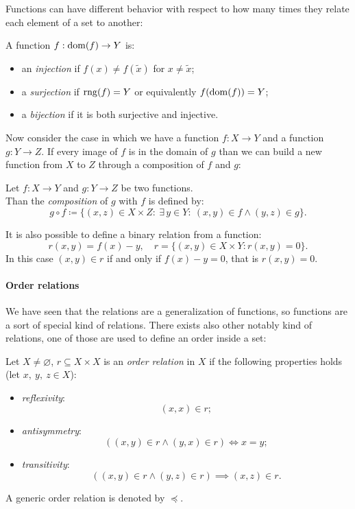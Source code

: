 Functions can have different behavior with respect to how many times they relate each element of a set to another:

\begin{defn}
	A function $f: \operatorname{dom}(f) \to Y$ is:
	\begin{itemize}
		\item an \emph{injection} if $f(x) \neq f(\tilde{x})$ for $x\neq \tilde{x}$;
		\item a \emph{surjection} if $\operatorname{rng}(f) = Y$ or equivalently $f(\operatorname{dom}(f)) = Y$;
		\item a \emph{bijection} if it is both surjective and injective.
	\end{itemize}
\end{defn}

Now consider the case in which we have a function $f: X \to Y$ and a function $g:Y \to Z$. If every image of $f$ is in the domain of $g$ than we can build a new function from $X$ to $Z$ through a composition of $f$ and $g$:
\begin{defn}
	Let $f: X \to Y$ and $g: Y \to Z$ be two functions.\\
	Than the \emph{composition} of $g$ with $f$ is defined by:
	$$
		g \circ f 
		\coloneqq \{(x,z)\in X \times Z :\ \exists \, y\in Y :\ (x,y) \in f \wedge (y,z)\in g \}
	.
	$$
\end{defn}

It is also possible to define a binary relation from a function:
$$r(x,y) = f(x) - y, \quad r = \{(x,y) \in X \times Y : r(x,y) = 0\}.$$
In this case $(x,y) \in r$ if and only if $f(x)-y =0$, that is $r(x,y) = 0$.


\paragraph{Order relations}

We have seen that the relations are a generalization of functions, so functions are a sort of special kind of relations. There exists also other notably kind of relations, one of those are used to define an order inside a set:
\begin{defn}
	Let $X \neq \varnothing$, $r \subseteq X \times X$ is an \emph{order relation} in $X$ if the following properties holds (let $x,\ y,\ z \in X$):
	\begin{itemize}
		\item \emph{reflexivity}: $$\left(x,x\right)\in r;$$
		\item \emph{antisymmetry}: $$ \left( \left(x,y\right)\in r\wedge \left(y,x\right)\in r \right) \iff x=y;$$
		\item \emph{transitivity}: $$\left(\left(x,y\right)\in r \wedge \left(y,z\right)\in r\right)\implies \left(x,z\right)\in r.$$
	\end{itemize}
	A generic order relation is denoted by $\preceq$.
\end{defn}

